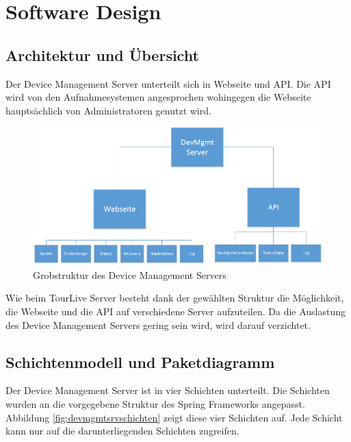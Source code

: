 \section{Software Design}
\subsection{Architektur und Übersicht}
Der Device Management Server unterteilt sich in Webseite und API. Die API wird von den Aufnahmesystemen angesprochen wohingegen die Webseite hauptsächlich von Administratoren genutzt wird.

\begin{figure}[H]
	\centering
	\includegraphics[width=140mm]{images/devmgmtsrv/uebersicht.png}
	\caption{Grobstruktur des Device Management Servers}
\end{figure}

Wie beim TourLive Server besteht dank der gewählten Struktur die Möglichkeit, die Webseite und die API auf verschiedene Server aufzuteilen. Da die Auslastung des Device Management Servers gering sein wird, wird darauf verzichtet.

\subsection{Schichtenmodell und Paketdiagramm}
Der Device Management Server ist in vier Schichten unterteilt. Die Schichten wurden an die vorgegebene Struktur des Spring Frameworks angepasst. Abbildung \ref{fig:devmgmtsrvschichten} zeigt diese vier Schichten auf. Jede Schicht kann nur auf die darunterliegenden Schichten zugreifen.

